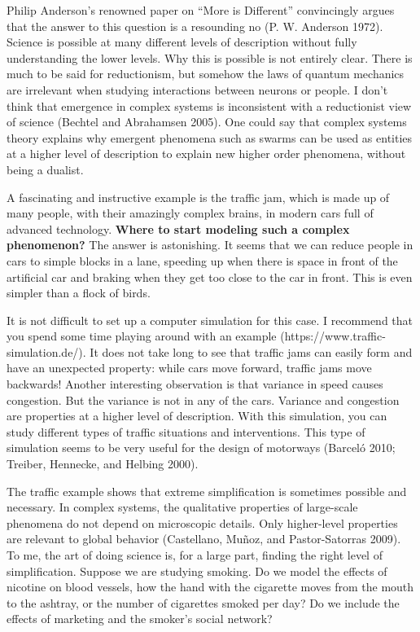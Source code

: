 \documentclass[
  letterpaper,
]{scrbook}
\begin{document}
Philip Anderson's renowned paper on ``More is Different'' convincingly
argues that the answer to this question is a resounding no (P. W.
Anderson 1972). Science is possible at many different levels of
description without fully understanding the lower levels. Why this is
possible is not entirely clear. There is much to be said for
reductionism, but somehow the laws of quantum mechanics are irrelevant
when studying interactions between neurons or people. I don't think that
emergence in complex systems is inconsistent with a reductionist view of
science (Bechtel and Abrahamsen 2005). One could say that complex
systems theory explains why emergent phenomena such as swarms can be
used as entities at a higher level of description to explain new higher
order phenomena, without being a dualist.

A fascinating and instructive example is the traffic jam, which is made
up of many people, with their amazingly complex brains, in modern cars
full of advanced technology. \textbf{Where to start modeling such a
complex phenomenon?} The answer is astonishing. It seems that we can
reduce people in cars to simple blocks in a lane, speeding up when there
is space in front of the artificial car and braking when they get too
close to the car in front. This is even simpler than a flock of birds.

It is not difficult to set up a computer simulation for this case. I
recommend that you spend some time playing around with an example
(https://www.traffic-simulation.de/). It does not take long to see that
traffic jams can easily form and have an unexpected property: while cars
move forward, traffic jams move backwards! Another interesting
observation is that variance in speed causes congestion. But the
variance is not in any of the cars. Variance and congestion are
properties at a higher level of description. With this simulation, you
can study different types of traffic situations and interventions. This
type of simulation seems to be very useful for the design of motorways
(Barceló 2010; Treiber, Hennecke, and Helbing 2000).

The traffic example shows that extreme simplification is sometimes
possible and necessary. In complex systems, the qualitative properties
of large-scale phenomena do not depend on microscopic details. Only
higher-level properties are relevant to global behavior (Castellano,
Muñoz, and Pastor-Satorras 2009). To me, the art of doing science is,
for a large part, finding the right level of simplification. Suppose we
are studying smoking. Do we model the effects of nicotine on blood
vessels, how the hand with the cigarette moves from the mouth to the
ashtray, or the number of cigarettes smoked per day? Do we include the
effects of marketing and the smoker's social network?
\end{document}
